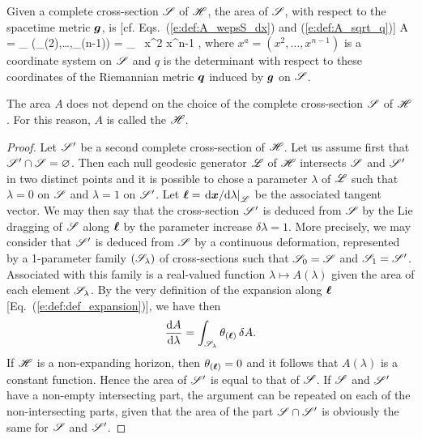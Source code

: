Given a complete cross-section $\mathscr{S}$ of $\mathscr{H}$, the area of $\mathscr{S}$, with respect to the spacetime metric $\bm{g}$, is [cf. Eqs.~(\ref{e:def:A_wepsS_dx}) and (\ref{e:def:A_sqrt_q})]
\be \label{e:neh:total_area}
    A = \int_{\Sp} \wepsS(\D{}_{(2)},\ldots,\D{}_{(n-1)})
        = \int_{\Sp}  \, \D x^2 \cdots \D x^{n-1} ,
\ee
where $x^a = (x^2, \ldots, x^{n-1})$ is a coordinate system on $\mathscr{S}$ and $q$ is
the determinant with respect to these coordinates of the Riemannian metric $\bm{q}$
induced by $\bm{g}$ on $\mathscr{S}$.

\begin{prop}
\label{p:neh:invariance_area}
The area $A$ does not depend on the choice of the complete cross-section $\mathscr{S}$
of $\mathscr{H}$.
For this reason, $A$ is
called the 
$\mathscr{H}$.
\end{prop}

\begin{proof}
Let $\mathscr{S}'$ be a second complete cross-section of $\mathscr{H}$. Let us assume first that
$\mathscr{S}'\cap\mathscr{S} = \varnothing$. Then each null geodesic generator $\mathscr{L}$ of $\mathscr{H}$ intersects
$\mathscr{S}$ and $\mathscr{S}'$ in two distinct points and it is possible to chose a parameter
$\lambda$ of $\mathscr{L}$ such that $\lambda=0$ on $\mathscr{S}$ and $\lambda=1$ on $\mathscr{S}'$.
Let $\bm{\ell} = \left. \mathrm{d}\bm{x}/\mathrm{d}\lambda \right| _{\mathscr{L}}$ be the associated tangent vector.
We may then say that the cross-section $\mathscr{S}'$ is deduced
from $\mathscr{S}$ by the Lie dragging of $\mathscr{S}$ along $\bm{\ell}$ by the parameter increase $\delta\lambda=1$.
More precisely, we may consider that $\mathscr{S}'$ is deduced from $\mathscr{S}$ by a
continuous deformation, represented by a 1-parameter family $(\mathscr{S}_{\lambda})$
of cross-sections such that $\mathscr{S}_0 = \mathscr{S}$ and $\mathscr{S}_1 = \mathscr{S}'$. Associated
with this family is a real-valued function $\lambda \mapsto A(\lambda)$
given the area of each element $\mathscr{S}_{\lambda}$. By the very definition
of the expansion along $\bm{\ell}$ [Eq.~(\ref{e:def:def_expansion})], we have then
\[
    \frac{\mathrm{d} A}{\mathrm{d}\lambda} = \int_{\mathscr{S}_{\lambda}} \theta_{(\bm{\ell})} \, \delta A .
\]
If $\mathscr{H}$ is a non-expanding horizon, then $\theta_{(\bm{\ell})}=0$ and it follows
that $A(\lambda)$ is a constant function. Hence the area of $\mathscr{S}'$ is equal
to that of $\mathscr{S}$. If $\mathscr{S}$ and $\mathscr{S}'$ have a non-empty intersecting part,
the argument can be repeated on each of the non-intersecting parts, given
that the area of the part $\mathscr{S}\cap\mathscr{S}'$ is obviously the same for $\mathscr{S}$
and $\mathscr{S}'$.
\end{proof}

